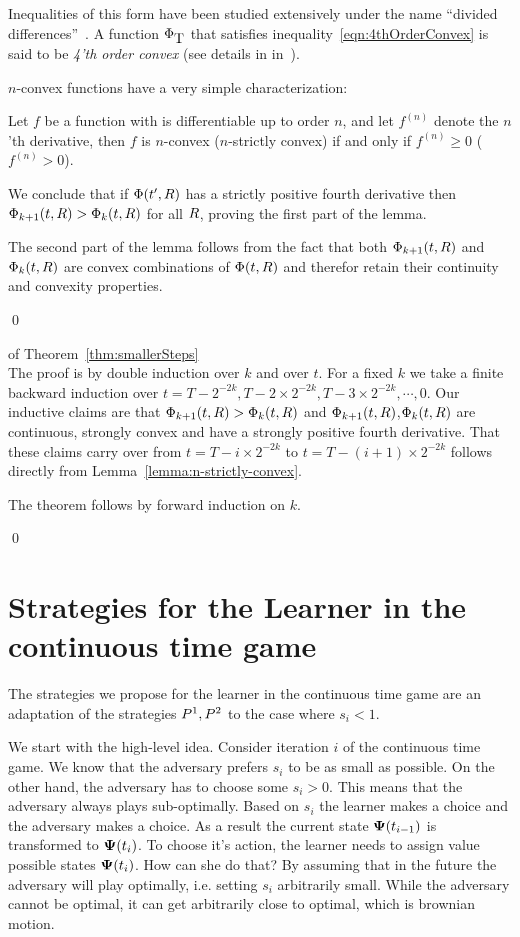 \documentclass{article}[12pt]
\begin{document}
Inequalities of this form have been studied extensively under the name
``divided differences''~\cite{popoviciu1965certaines,butt2016generalization, de2005divided}.
A function $\Phi_{\mbox{T}}$ that satisfies
inequality~\ref{eqn:4thOrderConvex} is said to be {\em 4'th order convex}
(see details in in~\cite{butt2016generalization}).

$n$-convex functions have a very simple characterization:
\begin{theorem}
  Let $f$ be a  function with is differentiable up to order $n$, and
  let $f^{(n)}$ denote the $n$'th derivative, then $f$ is $n$-convex
  ($n$-strictly convex) if and only if $f^{(n)} \geq 0$ ($f^{(n)} > 0$).
\end{theorem}

We conclude that if $\Phi(t',R)$ has a strictly positive fourth
derivative then $\Phi_{k+1}(t,R) > \Phi_{k}(t,R)$ for all $R$, proving
the first part of the lemma.

The second part of the lemma follows from the fact that
both $\Phi_{k+1}(t,R)$ and $\Phi_{k}(t,R)$ are convex combinations of
$\Phi(t,R)$ and therefor retain their continuity and convexity properties.

\qed

\proof  of Theorem~\ref{thm:smallerSteps} \\
The proof is by double induction over $k$ and over $t$.
For a fixed $k$ we take a finite backward induction over
$t=T-2^{-2k},T-2 \times 2^{-2k},T-3 \times 2^{-2k},\cdots,0$.
Our inductive claims are that $\Phi_{k+1}(t,R) > \Phi_{k}(t,R)$ and
$\Phi_{k+1}(t,R)$,$\Phi_{k}(t,R)$ are continuous, strongly convex and
have a strongly positive fourth derivative. That these claims carry over
from $t=T-i \times 2^{-2k}$ to  $t=T-(i+1) \times 2^{-2k}$ follows
directly from Lemma~\ref{lemma:n-strictly-convex}.

The theorem follows by forward induction on $k$.

\qed

\section{Strategies for the Learner in the continuous time game}
The strategies we propose for the learner in the continuous time game
are an adaptation of the strategies $P^1,P^2$ to the
case where $s_i<1$.

We start with the high-level idea. Consider iteration $i$ of the
continuous time game. We know that the adversary prefers $s_i$ to be
as small as possible. On the other hand, the adversary has to choose
some $s_i>0$. This means that the adversary always plays
sub-optimally. Based on $s_i$ the learner makes a choice and the
adversary makes a choice. As a result the current state ${\bf \Psi}(t_{i-1})$
is transformed to ${\bf \Psi}(t_i)$. To choose it's action, the learner
needs to assign value possible states ${\bf \Psi}(t_i)$. How can she do
that? By assuming that in the future the adversary will play
optimally, i.e. setting $s_i$ arbitrarily small. While the adversary
cannot be optimal, it can get arbitrarily close to optimal, which is
brownian motion.
\end{document}
